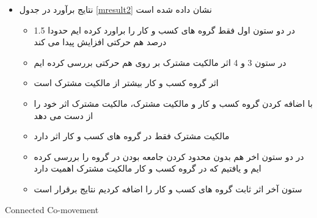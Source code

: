 \documentclass[12pt, a4paper]{article}
\begin{document}
\begin{itemize}
	\item 
	نتایج برآورد در جدول 
	\ref{mresult2}
	نشان داده شده است
	
\begin{itemize}
	\item 
	در دو ستون اول فقط گروه های کسب و کار را براورد کرده ایم حدودا 1.5 درصد هم حرکتی افزایش پیدا می کند
	\item 
	در ستون 3 و 4 اثر مالکیت مشترک بر روی هم حرکتی بررسی کرده ایم
	\item 
	اثر گروه کسب و کار بیشتر از مالکیت مشترک است
	\item 
	با اضافه کردن گروه کسب و کار و مالکیت مشترک، مالکیت مشترک اثر خود را از دست می دهد
	\item 
	مالکیت مشترک فقط در گروه های کسب و کار اثر دارد
	\item
	در دو ستون اخر هم بدون محدود کردن جامعه بودن در گروه را بررسی کرده ایم و یافتیم که در گروه کسب و کار مالکیت مشترک اهمیت دارد
	\item
	ستون آخر اثر ثابت گروه های کسب و کار را اضافه کردیم نتایج برقرار است
	
\end{itemize} 
\end{itemize}

 \begin{landscape}

	{\begin{table}[htbp]
	\caption{Connected Co-movement}
	\label{mresult2}
		\begin{LTR}
			\lr{}
		\end{LTR}
\end{table}}
 \end{landscape}
\FloatBarrier
\end{document}
